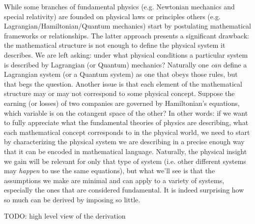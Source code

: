 \documentclass[aps,pra,10pt,twocolumn,floatfix,nofootinbib]{revtex4-1}
\theoremstyle{definition}
\begin{document}
While some branches of fundamental physics (e.g. Newtonian mechanics and special relativity) are founded on physical laws or principles others (e.g. Lagrangian/Hamiltonian/Quantum mechanics) start by postulating mathematical frameworks or relationships. The latter approach presents a significant drawback: the mathematical structure is not enough to define the physical system it describes. We are left asking: under what physical conditions a particular system is described by Lagrangian (or Quantum) mechanics? Naturally one \emph{can} define a Lagrangian system (or a Quantum system) as one that obeys those rules, but that begs the question. Another issue is that each element of the mathematical structure may or may not correspond to some physical concept. Suppose the earning (or losses) of two companies are governed by Hamiltonian's equations, which variable is on the cotangent space of the other? In other words: if we want to fully appreciate what the fundamental theories of physics are describing, what each mathematical concept corresponds to in the physical world, we need to start by characterizing the physical system we are describing in a precise enough way that it can be encoded in mathematical language. Naturally, the physical insight we gain will be relevant for only that type of system (i.e. other different systems may \emph{happen} to use the same equations), but what we'll see is that the assumptions we make are minimal and can apply to a variety of systems, especially the ones that are considered fundamental. It is indeed surprising how so much can be derived by imposing so little.

TODO: high level view of the derivation




\end{document}

